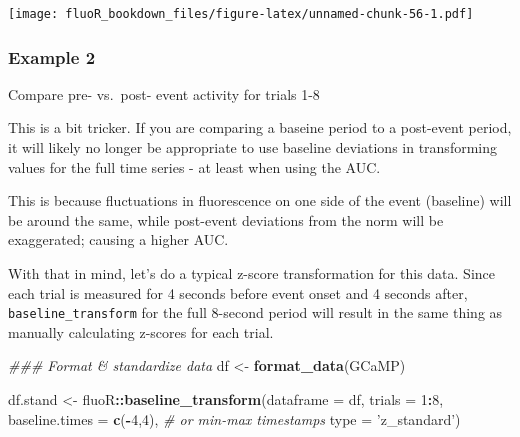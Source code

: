 \documentclass[
]{book}
\newenvironment{Shaded}{\begin{snugshade}}{\end{snugshade}}
\newcommand{\CommentTok}[1]{\textcolor[rgb]{0.56,0.35,0.01}{\textit{#1}}}
\newcommand{\DataTypeTok}[1]{\textcolor[rgb]{0.13,0.29,0.53}{#1}}
\newcommand{\DecValTok}[1]{\textcolor[rgb]{0.00,0.00,0.81}{#1}}
\newcommand{\KeywordTok}[1]{\textcolor[rgb]{0.13,0.29,0.53}{\textbf{#1}}}
\newcommand{\NormalTok}[1]{#1}
\newcommand{\OperatorTok}[1]{\textcolor[rgb]{0.81,0.36,0.00}{\textbf{#1}}}
\newcommand{\StringTok}[1]{\textcolor[rgb]{0.31,0.60,0.02}{#1}}
\begin{document}
\texttt{[image: fluoR\_bookdown\_files/figure-latex/unnamed-chunk-56-1.pdf]}

\hypertarget{analysis-app-auc-ex2}{%
\subsubsection{Example 2}\label{analysis-app-auc-ex2}}

Compare pre- vs.~post- event activity for trials 1-8

This is a bit tricker. If you are comparing a baseine period to a post-event period, it will likely no longer be appropriate to use baseline deviations in transforming values for the full time series - at least when using the AUC.

This is because fluctuations in fluorescence on one side of the event (baseline) will be around the same, while post-event deviations from the norm will be exaggerated; causing a higher AUC.

With that in mind, let's do a typical z-score transformation for this data. Since each trial is measured for 4 seconds before event onset and 4 seconds after, \texttt{baseline\_transform} for the full 8-second period will result in the same thing as manually calculating z-scores for each trial.

\begin{Shaded}
\begin{Highlighting}[]
\CommentTok{### Format & standardize data}
\NormalTok{df <-}\StringTok{ }\KeywordTok{format_data}\NormalTok{(GCaMP)}

\NormalTok{df.stand <-}\StringTok{ }\NormalTok{fluoR}\OperatorTok{::}\KeywordTok{baseline_transform}\NormalTok{(}\DataTypeTok{dataframe =}\NormalTok{ df,}
                                      \DataTypeTok{trials =} \DecValTok{1}\OperatorTok{:}\DecValTok{8}\NormalTok{,}
                                      \DataTypeTok{baseline.times =} \KeywordTok{c}\NormalTok{(}\OperatorTok{-}\DecValTok{4}\NormalTok{,}\DecValTok{4}\NormalTok{), }\CommentTok{# or min-max timestamps}
                                      \DataTypeTok{type =} \StringTok{'z_standard'}\NormalTok{)}
\end{Highlighting}
\end{Shaded}
\end{document}

